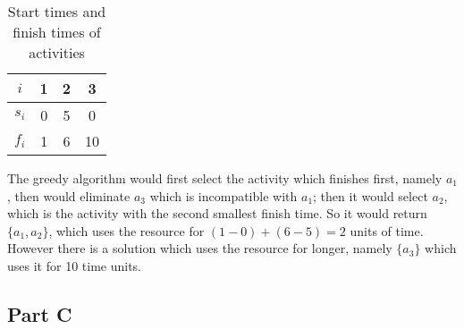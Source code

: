 \documentclass{article}
\begin{document}
\begin{table}[hbtp]
	\centering
	\begin{tabular}{|c|ccc|}
		\hline
		\(i\)   & 1 & 2 & 3 \\
		\hline
		\(s_i\) & 0 & 5 & 0 \\
		\(f_i\) & 1 & 6 & 10 \\
		\hline
	\end{tabular}
	\caption{Start times and finish times of activities}
	\label{q3b-1}
\end{table}

The greedy algorithm would first select the activity which finishes first, namely \(a_1\), then would eliminate \(a_3\) which is incompatible with \(a_1\); then it would select \(a_2\), which is the activity with the second smallest finish time. So it would return \(\{a_1, a_2\}\), which uses the resource for \((1-0)+(6-5)=2\) units of time. However there is a solution which uses the resource for longer, namely \(\{a_3\}\) which uses it for 10 time units.

\subsection*{Part C}
\end{document}
